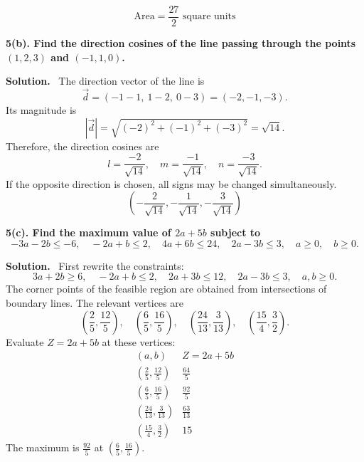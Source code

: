 \documentclass[11pt,a4paper]{article}
\newcommand{\question}[1]{\vspace{4pt}\begin{tcolorbox}[colback=softblue,colframe=headblue,boxrule=0.6pt,arc=2pt,left=5pt,right=5pt,top=4pt,bottom=4pt]\textbf{#1}\end{tcolorbox}}
\newcommand{\answer}{\textbf{Solution.}~}
\newcommand{\finalans}[1]{\[\boxed{#1}\]}
\begin{document}
\begin{center}
\end{center}

\finalans{\text{Area}=\frac{27}{2}\text{ square units}}

\question{5(b). Find the direction cosines of the line passing through the points $(1,2,3)$ and $(-1,1,0)$.}
\answer
The direction vector of the line is
\[
\vec d=(-1-1,\ 1-2,\ 0-3)=(-2,-1,-3).
\]
Its magnitude is
\[
|\vec d|=\sqrt{(-2)^2+(-1)^2+(-3)^2}=\sqrt{14}.
\]
Therefore, the direction cosines are
\[
l=\frac{-2}{\sqrt{14}},
\quad m=\frac{-1}{\sqrt{14}},
\quad n=\frac{-3}{\sqrt{14}}.
\]
If the opposite direction is chosen, all signs may be changed simultaneously.
\finalans{\left(-\frac2{\sqrt{14}},-\frac1{\sqrt{14}},-\frac3{\sqrt{14}}\right)}

\question{5(c). Find the maximum value of $2a+5b$ subject to
\[
-3a-2b\leq-6,
\quad -2a+b\leq2,
\quad 4a+6b\leq24,
\quad 2a-3b\leq3,
\quad a\geq0,
\quad b\geq0.
\]}
\answer
First rewrite the constraints:
\[
3a+2b\geq6,
\quad -2a+b\leq2,
\quad 2a+3b\leq12,
\quad 2a-3b\leq3,
\quad a,b\geq0.
\]
The corner points of the feasible region are obtained from intersections of boundary lines. The relevant vertices are
\[
\left(\frac25,\frac{12}{5}\right),
\quad
\left(\frac65,\frac{16}{5}\right),
\quad
\left(\frac{24}{13},\frac3{13}\right),
\quad
\left(\frac{15}{4},\frac32\right).
\]
Evaluate $Z=2a+5b$ at these vertices:
\[
\begin{array}{c|c}
(a,b)&Z=2a+5b\\\hline
\left(\frac25,\frac{12}{5}\right)&\frac{64}{5}\\
\left(\frac65,\frac{16}{5}\right)&\frac{92}{5}\\
\left(\frac{24}{13},\frac3{13}\right)&\frac{63}{13}\\
\left(\frac{15}{4},\frac32\right)&15
\end{array}
\]
The maximum is $\frac{92}{5}$ at $\left(\frac65,\frac{16}{5}\right)$.
\end{document}
